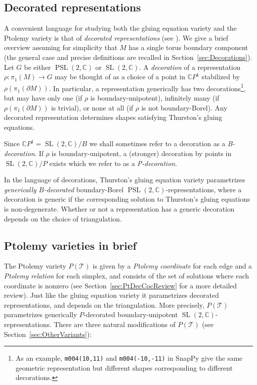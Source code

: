 \documentclass[11pt]{amsart}
\theoremstyle{plain}
\theoremstyle{definition}
\numberwithin{equation}{section}
\newcommand{\C}{\mathbb C}
\newcommand{\T}{\mathcal T}
\DeclareMathOperator{\PSL}{PSL}
\DeclareMathOperator{\SL}{SL}
\begin{document}
\subsection{Decorated representations}
A convenient language for studying both the gluing equation variety and the Ptolemy variety is that of \emph{decorated representations} (see \cite{ZickertDuke,GaroufalidisThurstonZickert}). We give a brief overview assuming for simplicity that $M$ has a single torus boundary component (the general case and precise definitions are recalled in Section~\ref{sec:Decorations}). Let $G$ be either $\PSL(2,\C)$ or $\SL(2,\C)$. A \emph{decoration} of a representation $\rho\colon\pi_1(M)\to G$ may be thought of as a choice of a point in $\C P^1$ stabilized by $\rho(\pi_1(\partial M))$. In particular, a representation generically has two decorations\footnote{As an example, \texttt{m004(10,11)} and \texttt{m004(-10,-11)} in SnapPy give the same geometric representation but different shapes corresponding to different decorations.}, but may have only one (if $\rho$ is boundary-unipotent), infinitely many (if $\rho(\pi_1(\partial M))$ is trivial), or none at all (if $\rho$ is not boundary-Borel). Any decorated representation determines shapes satisfying Thurston's gluing equations.

Since $\C P^1=\SL(2,\C)\big/B$ we shall sometimes refer to a decoration as a \emph{B-decoration}. If $\rho$ is boundary-unipotent, a (stronger) decoration by points in $\SL(2,\C)\big/P$ exists which we refer to as a \emph{P-decoration}.


In the language of decorations, Thurston's gluing equation variety parametrizes \emph{generically $B$-decorated} boundary-Borel $\PSL(2,\C)$-representations, where a decoration is generic if the corresponding solution to Thurston's gluing equations is non-degenerate. Whether or not a representation has a generic decoration depends on the choice of triangulation.


\subsection{Ptolemy varieties in brief}\label{sec:PtolemyBrief}
The Ptolemy variety $P(\T)$ is given by a \emph{Ptolemy coordinate} for each edge and a \emph{Ptolemy relation} for each simplex, and consists of the set of solutions where each coordinate is nonzero (see Section~\ref{sec:PtDecCocReview} for a more detailed review). Just like the gluing equation variety it parametrizes decorated representations, and depends on the triangulation. More precisely, $P(\T)$ parametrizes generically $P$-decorated boundary-unipotent $\SL(2,\C)$-representations. There are three natural modifications of $P(\T)$ (see Section~\ref{sec:OtherVariants}):
\end{document}
